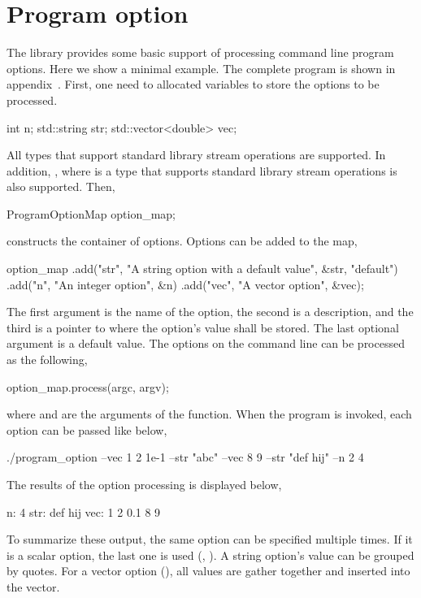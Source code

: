 \section{Program option}
\label{sec:Program option}

The library provides some basic support of processing command line program
options. Here we show a minimal example. The complete program is shown in
appendix~. First, one need to allocated
variables to store the options to be processed.
\begin{cppcode}
  int n;
  std::string str;
  std::vector<double> vec;
\end{cppcode}
All types that support standard library \io stream operations are supported. In
addition, , where  is a type that
supports standard library \io stream operations is also supported. Then,
\begin{cppcode}
  ProgramOptionMap option_map;
\end{cppcode}
constructs the container of options. Options can be added to the map,
\begin{cppcode}
  option_map
      .add("str", "A string option with a default value", &str, "default")
      .add("n", "An integer option", &n)
      .add("vec", "A vector option", &vec);
\end{cppcode}
The first argument is the name of the option, the second is a description, and
the third is a pointer to where the option's value shall be stored. The last
optional argument is a default value. The options on the command line can be
processed as the following,
\begin{cppcode}
  option_map.process(argc, argv);
\end{cppcode}
where  and  are the arguments of the
 function. When the program is invoked, each option can be
passed like below,
\begin{textcode}
  ./program_option --vec 1 2 1e-1 --str "abc" --vec 8 9 --str "def hij" --n 2 4
\end{textcode}
The results of the option processing is displayed below,
\begin{textcode}
  n: 4
  str: def hij
  vec: 1 2 0.1 8 9
\end{textcode}
To summarize these output, the same option can be specified multiple times. If
it is a scalar option, the last one is used (,
). A string option's value can be grouped by quotes. For a
vector option (), all values are gather together and inserted
into the vector.

